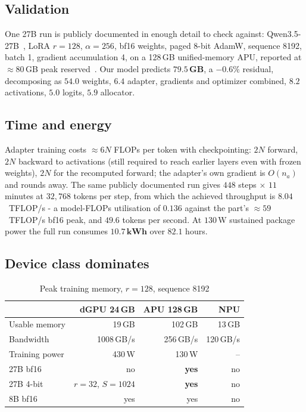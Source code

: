 \documentclass[conference]{IEEEtran}
\newcommand{\kWh}{\,\text{kWh}}
\begin{document}
\subsection{Validation}

One 27B run is publicly documented in enough detail to check against:
Qwen3.5-27B~\cite{qwen35_2026}, LoRA
$r = 128$, $\alpha = 256$, bf16 weights, paged 8-bit AdamW, sequence 8192, batch
1, gradient accumulation 4, on a 128\,GB unified-memory APU, reported at
$\approx 80$\,GB peak reserved~\cite{strixhalo2026}. Our model predicts
$\mathbf{79.5}$\,\textbf{GB}, a $-0.6\%$ residual, decomposing as $54.0$ weights,
$6.4$ adapter, gradients and optimizer combined, $8.2$ activations, $5.0$ logits, $5.9$
allocator.

\subsection{Time and energy}

Adapter training costs $\approx 6N$ FLOPs per token with checkpointing: $2N$
forward, $2N$ backward to activations (still required to reach earlier layers
even with frozen weights), $2N$ for the recomputed forward; the adapter's own
gradient is $O(n_a)$ and rounds away. The same publicly documented run gives
$448$ steps $\times$ $11$ minutes at $32{,}768$ tokens per step, from which the
achieved throughput is $\mathbf{8.04}$~TFLOP/s - a model-FLOPs utilisation of
$0.136$ against the part's $\approx 59$~TFLOP/s bf16 peak, and $49.6$ tokens per
second. At $130$\,W sustained package power the full run consumes
$\mathbf{10.7\kWh}$ over $82.1$ hours.

\subsection{Device class dominates}

\begin{table}[t]
\caption{Peak training memory, $r{=}128$, sequence 8192}
\label{tab:devices}
\centering
\small
\begin{tabular}{lrrr}
\toprule
& \textbf{dGPU 24\,GB} & \textbf{APU 128\,GB} & \textbf{NPU} \\
\midrule
Usable memory & 19\,GB & 102\,GB & 13\,GB \\
Bandwidth & 1008\,GB/s & 256\,GB/s & 120\,GB/s \\
Training power & 430\,W & 130\,W & -- \\
\midrule
27B bf16 & no & \textbf{yes} & no \\
27B 4-bit & $r{=}32$, $S{=}1024$ & \textbf{yes} & no \\
8B bf16 & yes & yes & no \\
\bottomrule
\end{tabular}
\end{table}
\end{document}
